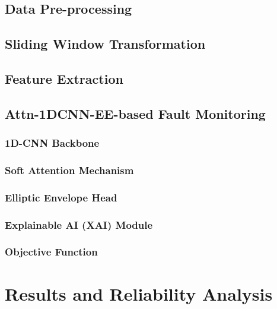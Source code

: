 \documentclass[lettersize,journal]{IEEEtran}
\begin{document}
\subsection{Data Pre-processing}

\subsection{Sliding Window Transformation}

\subsection{Feature Extraction}

\subsection{Attn-1DCNN-EE-based Fault Monitoring}

\subsubsection{1D-CNN Backbone}

\subsubsection{Soft Attention Mechanism}

\subsubsection{Elliptic Envelope Head}

\subsubsection{Explainable AI (XAI) Module}

\subsubsection{Objective Function}

\section{Results and Reliability Analysis}
\end{document}
